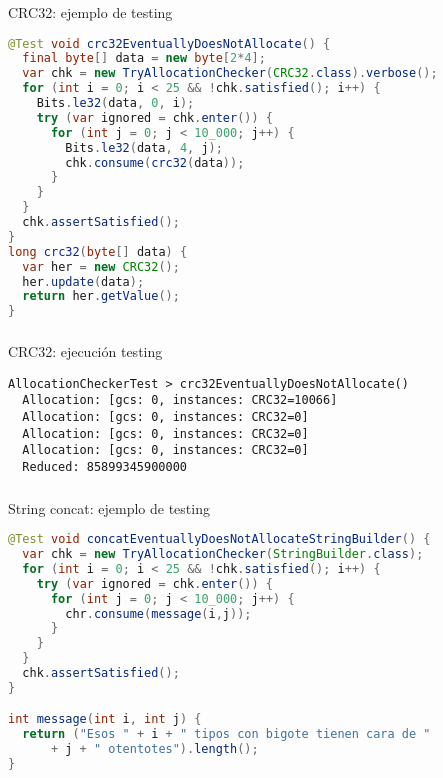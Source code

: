 \begin{frame}[fragile]
  \begin{block}{CRC32: ejemplo de testing}
    \begin{lstlisting}[language=java]
@Test void crc32EventuallyDoesNotAllocate() {
  final byte[] data = new byte[2*4];
  var chk = new TryAllocationChecker(CRC32.class).verbose();
  for (int i = 0; i < 25 && !chk.satisfied(); i++) {
    Bits.le32(data, 0, i);
    try (var ignored = chk.enter()) {
      for (int j = 0; j < 10_000; j++) {
        Bits.le32(data, 4, j);
        chk.consume(crc32(data));
      }
    }
  }
  chk.assertSatisfied();
}
long crc32(byte[] data) {
  var her = new CRC32();
  her.update(data);
  return her.getValue();
}
    \end{lstlisting}
  \end{block}
\end{frame}

\begin{frame}[fragile]
  \frametitle{\ft}
  \begin{block}{CRC32: ejecución testing}
    \begin{lstlisting}
AllocationCheckerTest > crc32EventuallyDoesNotAllocate()
  Allocation: [gcs: 0, instances: CRC32=10066]
  Allocation: [gcs: 0, instances: CRC32=0]
  Allocation: [gcs: 0, instances: CRC32=0]
  Allocation: [gcs: 0, instances: CRC32=0]
  Reduced: 85899345900000
    \end{lstlisting}
  \end{block}
\end{frame}


\begin{frame}[fragile]
  \frametitle{\ft}
  \begin{block}{String concat: ejemplo de testing}
    \begin{lstlisting}[language=java]
@Test void concatEventuallyDoesNotAllocateStringBuilder() {
  var chk = new TryAllocationChecker(StringBuilder.class);
  for (int i = 0; i < 25 && !chk.satisfied(); i++) {
    try (var ignored = chk.enter()) {
      for (int j = 0; j < 10_000; j++) {
        chr.consume(message(i,j));
      }
    }
  }
  chk.assertSatisfied();
}

int message(int i, int j) {
  return ("Esos " + i + " tipos con bigote tienen cara de "
      + j + " otentotes").length();
}
    \end{lstlisting}
  \end{block}
\end{frame}

